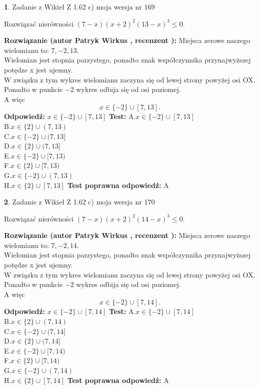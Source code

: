 \documentclass[12pt, a4paper]{article}
\theoremstyle{definition} %
\newtheorem{zad}{}
\newcommand{\zadStart}[1]{\begin{zad}#1\newline}
\newcommand{\zadStop}{\end{zad}}
\newcommand{\rozwStart}[2]{\noindent \textbf{Rozwiązanie (autor #1 , recenzent #2): }\newline}
\newcommand{\rozwStop}{\newline}
\newcommand{\odpStart}{\noindent \textbf{Odpowiedź:}\newline}
\newcommand{\odpStop}{\newline}
\newcommand{\testStart}{\noindent \textbf{Test:}\newline}
\newcommand{\testStop}{\newline}
\newcommand{\kluczStart}{\noindent \textbf{Test poprawna odpowiedź:}\newline}
\newcommand{\kluczStop}{\newline}
\begin{document}
\zadStart{Zadanie z Wikieł Z 1.62 c) moja wersja nr 169}

Rozwiązać nierówności $(7-x)(x+2)^{2}(13-x)^{3}\le0$.
\zadStop
\rozwStart{Patryk Wirkus}{}
Miejsca zerowe naszego wielomianu to: $7, -2, 13$.\\
Wielomian jest stopnia parzystego, ponadto znak współczynnika przy\linebreak najwyższej potędze x jest ujemny.\\ W związku z tym wykres wielomianu zaczyna się od lewej strony powyżej osi OX.\\
Ponadto w punkcie $-2$ wykres odbija się od osi poziomej.\\
A więc $$x \in \{-2\} \cup [7,13].$$
\rozwStop
\odpStart
$x \in \{-2\} \cup [7,13]$
\odpStop
\testStart
A.$x \in \{-2\} \cup [7,13]$\\
B.$x \in \{2\} \cup (7,13)$\\
C.$x \in \{-2\} \cup (7,13]$\\
D.$x \in \{2\} \cup (7,13]$\\
E.$x \in \{-2\} \cup [7,13)$\\
F.$x \in \{2\} \cup [7,13)$\\
G.$x \in \{-2\} \cup (7,13)$\\
H.$x \in \{2\} \cup [7,13]$
\testStop
\kluczStart
A
\kluczStop



\zadStart{Zadanie z Wikieł Z 1.62 c) moja wersja nr 170}

Rozwiązać nierówności $(7-x)(x+2)^{2}(14-x)^{3}\le0$.
\zadStop
\rozwStart{Patryk Wirkus}{}
Miejsca zerowe naszego wielomianu to: $7, -2, 14$.\\
Wielomian jest stopnia parzystego, ponadto znak współczynnika przy\linebreak najwyższej potędze x jest ujemny.\\ W związku z tym wykres wielomianu zaczyna się od lewej strony powyżej osi OX.\\
Ponadto w punkcie $-2$ wykres odbija się od osi poziomej.\\
A więc $$x \in \{-2\} \cup [7,14].$$
\rozwStop
\odpStart
$x \in \{-2\} \cup [7,14]$
\odpStop
\testStart
A.$x \in \{-2\} \cup [7,14]$\\
B.$x \in \{2\} \cup (7,14)$\\
C.$x \in \{-2\} \cup (7,14]$\\
D.$x \in \{2\} \cup (7,14]$\\
E.$x \in \{-2\} \cup [7,14)$\\
F.$x \in \{2\} \cup [7,14)$\\
G.$x \in \{-2\} \cup (7,14)$\\
H.$x \in \{2\} \cup [7,14]$
\testStop
\kluczStart
A
\kluczStop
\end{document}
